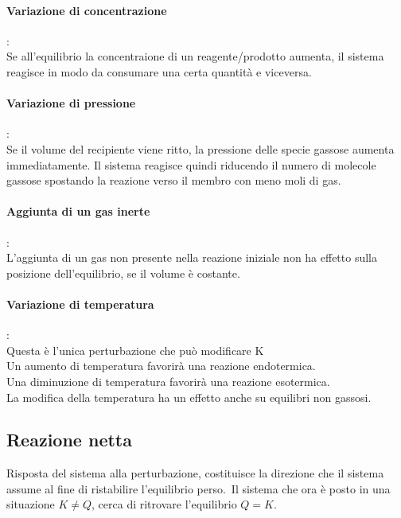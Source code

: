 \paragraph*{Variazione di concentrazione}:\\
Se all'equilibrio la concentraione di un reagente/prodotto aumenta, il sistema reagisce in modo da consumare una certa quantità e viceversa.
\paragraph*{Variazione di pressione}:\\
Se il volume del recipiente viene ritto, la pressione delle specie gassose aumenta immediatamente. Il sistema reagisce quindi riducendo il numero di molecole gassose spostando la reazione verso il membro con meno moli di gas.
\paragraph*{Aggiunta di un gas inerte}:\\
L'aggiunta di un gas non presente nella reazione iniziale non ha effetto sulla posizione dell'equilibrio, se il volume è costante.\
\paragraph*{Variazione di temperatura}:\\
Questa è l'unica perturbazione che può modificare K\\
Un aumento di temperatura favorirà una reazione endotermica.\\
Una diminuzione di temperatura favorirà una reazione esotermica.\\
La modifica della temperatura ha un effetto anche su equilibri non gassosi.
\subsection{Reazione netta}
Risposta del sistema alla perturbazione, costituisce la direzione che il sistema assume al fine di ristabilire l'equilibrio perso.\
Il sistema che ora è posto in una situazione $K \ne Q$, cerca di ritrovare l'equilibrio $Q = K$.